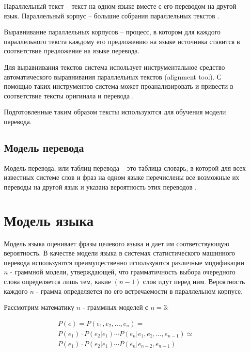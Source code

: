 Параллельный текст -- текст на одном языке вместе с его переводом на другой язык. Параллельный корпус -- большие собрания параллельных текстов \cite{smt}.

Выравнивание параллельных корпусов -- процесс, в котором для каждого параллельного текста каждому его предложению на языке источника ставится в соответствие предложение на языке перевода. 

Для выравнивания текстов система использует инструментальное средство
автоматического выравнивания параллельных текстов (alignment tool). С
помощью таких инструментов система может проанализировать и привести в
соответствие тексты оригинала и перевода \cite{smt2}. 

Подготовленные таким образом тексты используются для обучения модели перевода.

\subsection{Модель перевода}

Модель перевода, или таблиц перевода – это таблица-словарь, в которой для всех известных системе слов и фраз на одном языке перечислены все возможные их переводы на другой язык и указана вероятность этих переводов \cite{smt2}.

\section{Модель языка}

Модель языка оценивает фразы целевого языка и дает им соответствующую вероятность. В качестве модели языка в системах статистического машинного перевода используются преимущественно используются различные модификации $n$ - граммной модели, утверждающей, что грамматичность выбора очередного слова определяется лишь тем, какие $(n - 1)$ слов идут перед ним. Вероятность каждого $n$ - грамма определяется по его встречаемости в параллельном корпусе\cite{smt}.

Рассмотрим  математику $n$ - граммных моделей с $n = 3$:

\begin{equation}
	\label{eq:ngram}
	\begin{gathered}
		P(e) = P(e_1, e_2, \ldots, e_n) = \\
		P(e_1) \cdot P(e_2 | e_1) \dotsb P(e_n | e_1, e_2, \ldots , e_{n-1}) \simeq \\
		P(e_1) \cdot P(e_2 | e_1) \dotsb P(e_n | e_{n-2},e_{n-1})
	\end{gathered}
\end{equation}

